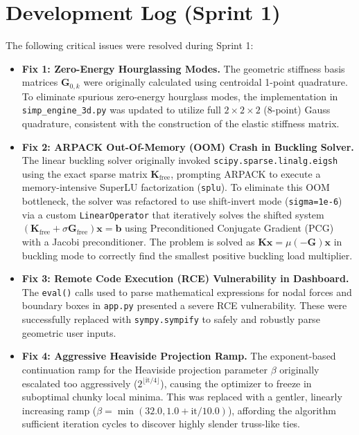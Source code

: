 \documentclass[11pt, a4paper]{article}
\begin{document}
\section{Development Log (Sprint 1)}
The following critical issues were resolved during Sprint 1:
\begin{itemize}
    \item \textbf{Fix 1: Zero-Energy Hourglassing Modes.} The geometric stiffness basis matrices $\mathbf{G}_{0,k}$ were originally calculated using centroidal 1-point quadrature. To eliminate spurious zero-energy hourglass modes, the implementation in \texttt{simp\_engine\_3d.py} was updated to utilize full $2\times2\times2$ (8-point) Gauss quadrature, consistent with the construction of the elastic stiffness matrix.
    \item \textbf{Fix 2: ARPACK Out-Of-Memory (OOM) Crash in Buckling Solver.} The linear buckling solver originally invoked \texttt{scipy.sparse.linalg.eigsh} using the exact sparse matrix $\mathbf{K}_{\text{free}}$, prompting ARPACK to execute a memory-intensive SuperLU factorization (\texttt{splu}). To eliminate this OOM bottleneck, the solver was refactored to use shift-invert mode (\texttt{sigma=1e-6}) via a custom \texttt{LinearOperator} that iteratively solves the shifted system $(\mathbf{K}_{\text{free}} + \sigma \mathbf{G}_{\text{free}})\mathbf{x} = \mathbf{b}$ using Preconditioned Conjugate Gradient (PCG) with a Jacobi preconditioner. The problem is solved as $\mathbf{K} \mathbf{x} = \mu (-\mathbf{G}) \mathbf{x}$ in buckling mode to correctly find the smallest positive buckling load multiplier.
    \item \textbf{Fix 3: Remote Code Execution (RCE) Vulnerability in Dashboard.} The \texttt{eval()} calls used to parse mathematical expressions for nodal forces and boundary boxes in \texttt{app.py} presented a severe RCE vulnerability. These were successfully replaced with \texttt{sympy.sympify} to safely and robustly parse geometric user inputs.
    \item \textbf{Fix 4: Aggressive Heaviside Projection Ramp.} The exponent-based continuation ramp for the Heaviside projection parameter $\beta$ originally escalated too aggressively ($2^{\lfloor \text{it}/4 \rfloor}$), causing the optimizer to freeze in suboptimal chunky local minima. This was replaced with a gentler, linearly increasing ramp ($\beta = \min(32.0, 1.0 + \text{it} / 10.0)$), affording the algorithm sufficient iteration cycles to discover highly slender truss-like ties.
\end{itemize}
\end{document}

